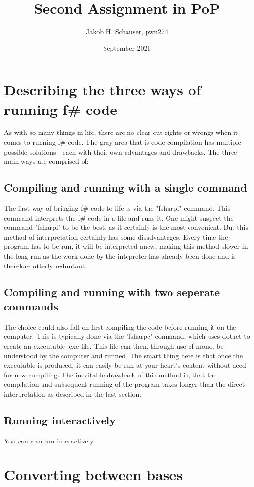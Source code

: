 \documentclass{article}
\title{Second Assignment in PoP}
\author{Jakob H. Schauser, pwn274}
\date{September 2021}
\begin{document}
\maketitle
\newpage
\tableofcontents
\newpage
\section{Describing the three ways of running f\# code}
As with so many things in life, there are no clear-cut rights or wrongs when it comes to running f\# code. The gray area that is code-compilation has multiple possible solutions
 - each with their own advantages and drawbacks. The three main ways are comprised of:
\subsection{Compiling and running with a single command}
The first way of bringing f\# code to life is via the "fsharpi"-command. This command interprets the f\# code in a file and runs it.
One might suspect the command "fsharpi" to be the best, as it certainly is the most convenient. But this method of interpretation certainly has some disadvantages. 
Every time the program has to be run, it will be interpreted anew, making this method slower in the long run as the work done by the intepreter has already been done and is 
therefore utterly reduntant.
\subsection{Compiling and running with two seperate commands}
The choice could also fall on first compiling the code before running it on the computer. This is typically done via the "fsharpc" command, which uses dotnet to create an 
executable .exe file. This file can then, through use of mono, be understood by the computer and runned. The smart thing here is that once the executable is produced, it can
easily be run at your heart's content without need for new compiling. The inevitable drawback of this method is, that the compilation and subsequent running of the program
takes longer than the direct interpretation as described in the last section.
\subsection{Running interactively}
You can also run interactively.

\section{Converting between bases}
\end{document}
